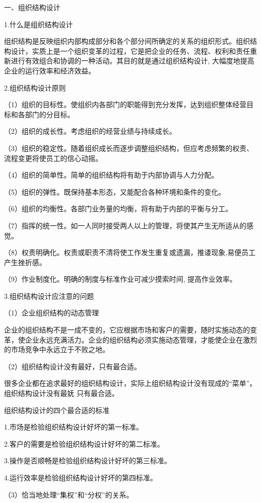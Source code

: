 \documentclass[CJK]{z-article}
\begin{document}
    一、组织结构设计

    1.什么是组织结构设计

    组织结构是反映组织内部构成部分和各个部分间所确定的关系的组织形式。组织结构设计，实质上是一个组织变革的过程，它是把企业的任务、流程、权利和责任重新进行有效组合和协调的一种活动。其目的就是通过组织结构设计, 大幅度地提高企业的运行效率和经济效益。

    2.组织结构设计原则

    （1）组织的目标性。使组织内各部门的职能得到充分发挥，达到组织整体经营目标和各部门的分目标。

    （2）组织的成长性。考虑组织的经营业绩与持续成长。

    （3）组织的稳定性。随着组织成长而逐步调整组织结构，但应考虑频繁的权责、流程变更将使员工的信心动摇。

    （4）组织的简单性。简单的组织结构将有助于内部协调与人力分配。

    （5）组织的弹性。既保持基本形态，又能配合各种环境和条件的变化。

    （6）组织的均衡性。各部门业务量的均衡，将有助于内部的平衡与分工。

    （7）指挥的统一性。如一人同时接受两人以上的管理，将使其产生无所适从的感觉。

    （8）权责明确化。权责或职责不清将使工作发生重复或遗漏，推诿现象,易便员工产生挫折感。

    （9）作业制度化。明确的制度与标准作业可减少摸索时间, 提高作业效率。

    3.组织结构设计应注意的问题

    （1）企业组织结构的动态管理

    企业的组织结构不是一成不变的，它应根据市场和客户的需要，随时实施动态的变革，使企业永远充满活力。企业的组织结构必须实施动态管理，才能使企业在激烈的市场竞争中永远立于不败之地。

  （2）组织结构设计没有最好，只有最合适。

    很多企业都在追求最好的组织结构设计，实际上组织结构设计没有现成的“菜单”。组织结构设计没有最妩 只有最合适。

    组织结构设计的四个最合适的标准

    1.市场是检验组织结构设计好坏的第一标准。

    2.客户的需要是检验组织结构设计好坏的第二标准。

    3.操作是否顺畅是检验组织结构设计好坏的第三标准。

    4.运行效率是检验组织结构设计好坏的第四标准。

  （3）恰当地处理“集权”和“分权”的关系。
\end{document}
